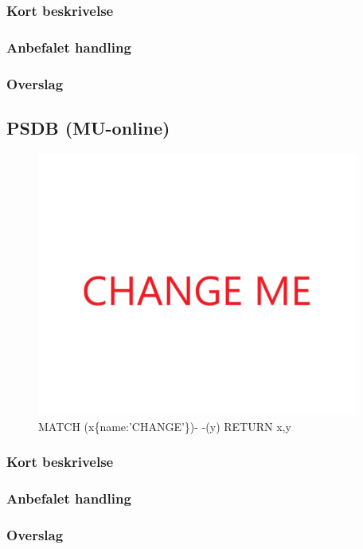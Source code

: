\documentclass{article}
\begin{document}
\subsubsection{Kort beskrivelse}
\subsubsection{Anbefalet handling}
\subsubsection{Overslag}


\subsection{PSDB (MU-online)}
\begin{figure}[h]
\includegraphics[width=300pt]{CHANGE.PNG}
\caption{MATCH (x\{name:'CHANGE'\})- -(y) RETURN x,y}
\end{figure}
\subsubsection{Kort beskrivelse}
\subsubsection{Anbefalet handling}
\subsubsection{Overslag}
\end{document}
